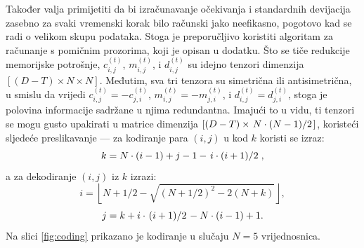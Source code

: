 \documentclass[lmodern, utf8, diplomski, numeric]{fer}
\newcommand{\q}{\left}
\newcommand{\w}{\right}
\begin{document}
  Također valja primijetiti da bi izračunavanje očekivanja i standardnih devijacija zasebno za svaki vremenski korak bilo računski jako neefikasno, pogotovo kad se radi o velikom skupu podataka.
  Stoga je preporučljivo koristiti algoritam za računanje s pomičnim prozorima, koji je opisan u dodatku.
  Što se tiče redukcije memorijske potrošnje, $c_{i,j}^{\q(t\w)}$, $m_{i,j}^{\q(t\w)}$, i $d_{i,j}^{\q(t\w)}$ su idejno tenzori dimenzija $\q[(D - T) \times N \times N\w]$.
  Međutim, sva tri tenzora su simetrična ili antisimetrična, u smislu da vrijedi $c_{i,j}^{\q(t\w)} = -c_{j,i}^{\q(t\w)}$, $m_{i,j}^{\q(t\w)} = -m_{j,i}^{\q(t\w)}$, i $d_{i,j}^{\q(t\w)} = d_{j,i}^{\q(t\w)}$, stoga je polovina informacije sadržane u njima redundantna.
  Imajući to u vidu, ti tenzori se mogu gusto upakirati u matrice dimenzija $\q[(D - T) \times \q. N\cdot(N - 1) \middle/ 2\w.\w]$, koristeći sljedeće preslikavanje --- za kodiranje para $(i,j)$ u kod $k$ koristi se izraz:
  \begin{equation} k = N \cdot (i - 1) + j - 1 - \q. i \cdot (i + 1) \middle/ 2\w., \end{equation}
  a za dekodiranje $(i, j)$ iz $k$ izrazi:
  \begin{equation} i = \q \lfloor N + 1/2 - \sqrt{(N + 1/2)^2 - 2(N + k)} \w \rfloor, \end{equation}
  \begin{equation} j = k + i \cdot \q.(i + 1) \middle/ 2\w. - N \cdot (i - 1) + 1. \end{equation}
  Na slici \ref{fig:coding} prikazano je kodiranje u slučaju $N = 5$ vrijednosnica.
  
\end{document}
